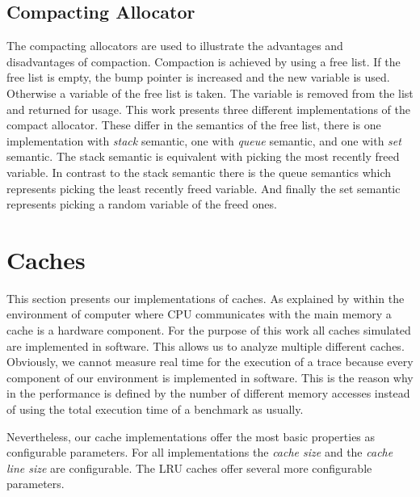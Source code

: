 \documentclass[onecolumn, openright, master, english, signatures]{dbrgrptt}
\begin{document}
\subsection{Compacting Allocator}\label{ssec:allocator-compact}

The compacting allocators are used to illustrate the advantages and disadvantages of compaction.
Compaction is achieved by using a free list.
If the free list is empty, the bump pointer is increased and the new variable is used.
Otherwise a variable of the free list is taken.
The variable is removed from the list and returned for usage.
This work presents three different implementations of the compact allocator.
These differ in the semantics of the free list, there is one implementation with \emph{stack} semantic, one with \emph{queue} semantic, and one with \emph{set} semantic.
The stack semantic is equivalent with picking the most recently freed variable.
In contrast to the stack semantic there is the queue semantics which represents picking the least recently freed variable.
And finally the set semantic represents picking a random variable of the freed ones.


\section{Caches}\label{sec:caches}

This section presents our implementations of caches.
As explained by  within the environment of computer where \ac{CPU} communicates with the main memory a cache is a hardware component.
For the purpose of this work all caches simulated are implemented in software.
This allows us to analyze multiple different caches.
Obviously, we cannot measure real time for the execution of a \ac{trace} because every component of our environment is implemented in software.
This is the reason why in  the performance is defined by the number of different memory accesses instead of using the total execution time of a benchmark as usually.

Nevertheless, our cache implementations offer the most basic properties as configurable parameters.
For all implementations the \emph{cache size} and the \emph{cache line size} are configurable.
The \ac{LRU} caches offer several more configurable parameters.
\end{document}
